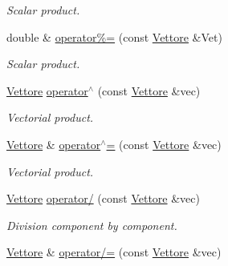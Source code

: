 \begin{DoxyCompactItemize}
\begin{DoxyCompactList}\small\item\em Scalar product. \end{DoxyCompactList}\item 
double \& \hyperlink{classVettore_a478ce9f6aea546ba5e51de78f481e9a2}{operator\%=} (const \hyperlink{classVettore}{Vettore} \&Vet)\hypertarget{classVettore_a478ce9f6aea546ba5e51de78f481e9a2}{}\label{classVettore_a478ce9f6aea546ba5e51de78f481e9a2}

\begin{DoxyCompactList}\small\item\em Scalar product. \end{DoxyCompactList}\item 
\hyperlink{classVettore}{Vettore} \hyperlink{classVettore_a41cbdc407d57951a3a979cef317773e8}{operator$^\wedge$} (const \hyperlink{classVettore}{Vettore} \&vec)\hypertarget{classVettore_a41cbdc407d57951a3a979cef317773e8}{}\label{classVettore_a41cbdc407d57951a3a979cef317773e8}

\begin{DoxyCompactList}\small\item\em Vectorial product. \end{DoxyCompactList}\item 
\hyperlink{classVettore}{Vettore} \& \hyperlink{classVettore_a2680ccae9c643e24af0edacd4c1e6d46}{operator$^\wedge$=} (const \hyperlink{classVettore}{Vettore} \&vec)\hypertarget{classVettore_a2680ccae9c643e24af0edacd4c1e6d46}{}\label{classVettore_a2680ccae9c643e24af0edacd4c1e6d46}

\begin{DoxyCompactList}\small\item\em Vectorial product. \end{DoxyCompactList}\item 
\hyperlink{classVettore}{Vettore} \hyperlink{classVettore_aab8ad16c726ce7a08cfd9425aea42326}{operator/} (const \hyperlink{classVettore}{Vettore} \&vec)\hypertarget{classVettore_aab8ad16c726ce7a08cfd9425aea42326}{}\label{classVettore_aab8ad16c726ce7a08cfd9425aea42326}

\begin{DoxyCompactList}\small\item\em Division component by component. \end{DoxyCompactList}\item 
\hyperlink{classVettore}{Vettore} \& \hyperlink{classVettore_a21800796b8c71b2fbde47de0f4bca118}{operator/=} (const \hyperlink{classVettore}{Vettore} \&vec)\hypertarget{classVettore_a21800796b8c71b2fbde47de0f4bca118}{}\label{classVettore_a21800796b8c71b2fbde47de0f4bca118}


\end{DoxyCompactItemize}
